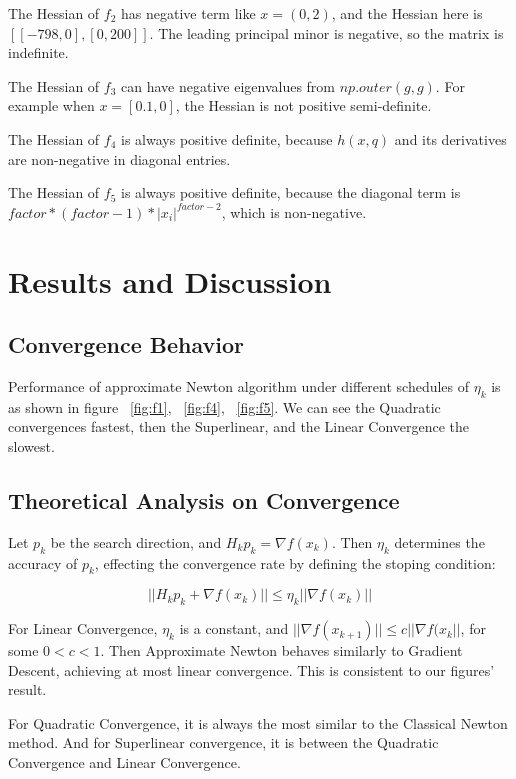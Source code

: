 \documentclass[12pt]{article}
\begin{document}
The Hessian of $f_2$ has negative term like $x=(0,2)$, and the Hessian here is $[[-798, 0], [0, 200]]$. The leading principal minor is negative, so the matrix is indefinite. 

The Hessian of $f_3$ can have negative eigenvalues from $np.outer(g,g)$. For example when $x=[0.1,0]$, the Hessian is not positive semi-definite.

The Hessian of $f_4$ is always positive definite, because $h(x,q)$ and its derivatives are non-negative in diagonal entries.

The Hessian of $f_5$ is always positive definite, because the diagonal term is $factor*(factor-1)*|x_i|^{factor-2}$, which is non-negative.


\section{Results and Discussion}

\subsection{Convergence Behavior}

Performance of approximate Newton algorithm under different schedules of $\eta_k$ is as shown in figure ~\ref{fig:f1}, ~\ref{fig:f4}, ~\ref{fig:f5}. We can see the Quadratic  convergences fastest, then the Superlinear, and the Linear Convergence the slowest.

\subsection{Theoretical Analysis on Convergence}
Let $p_k$ be the search direction, and $H_k p_k = \nabla f(x_k)$. Then $\eta_k$ determines the accuracy of $p_k$, effecting the convergence rate by defining the stoping condition:

\begin{equation}
||H_k p_k + \nabla f(x_k)|| \leq \eta_k || \nabla f(x_k) ||
\end{equation}

For Linear Convergence, $\eta_k$ is a constant, and $||\nabla f(x_{k+1})|| \leq c ||\nabla f(x_{k}||$, for some $0<c<1$. Then Approximate Newton behaves similarly to Gradient Descent, achieving at most linear convergence. This is consistent to our figures' result.

For Quadratic Convergence, it is always the most similar to the Classical Newton method. And for Superlinear convergence, it is between the Quadratic Convergence and Linear Convergence. 
\end{document}

